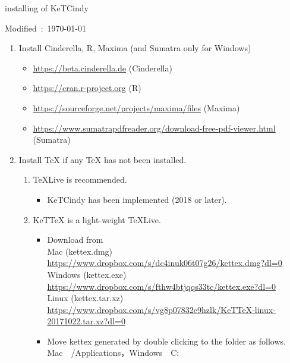 \documentclass{article}
\begin{document}
\begin{center}
installing of KeTCindy 
\end{center}

\hfill Modified\ :\ \today

\begin{enumerate}[\bf\large 1.]
\item Install Cinderella, R, Maxima (and Sumatra only for Windows)
 \begin{itemize}
 \item \url{https://beta.cinderella.de}  (Cinderella)
 \item \url{https://cran.r-project.org}   (R)
 \item \url{https://sourceforge.net/projects/maxima/files}  (Maxima)
 \item \url{https://www.sumatrapdfreader.org/download-free-pdf-viewer.html} (Sumatra)
 \end{itemize}
\item Install TeX if any TeX has not been installed.
 \begin{enumerate}[(1)]
 \item TeXLive is recommended.
    \begin{itemize}
    \item KeTCindy has been implemented (2018 or later).
    \end{itemize}
 \item KeTTeX is a light-weight TeXLive.
    \begin{itemize}
    \item Download from\\
    \hspace*{5mm}Mac (kettex.dmg)\\
    \hspace*{10mm}\url{https://www.dropbox.com/s/dc4inuk06t07g26/kettex.dmg?dl=0}\\
    \hspace*{5mm}Windows (kettex.exe)\\
    \hspace*{10mm}\url{https://www.dropbox.com/s/fthw4btjqqs33tc/kettex.exe?dl=0}\\
    \hspace*{5mm}Linux (kettex.tar.xz)\\
    \hspace*{10mm}\url{https://www.dropbox.com/s/vg8p07832e9hzlk/KeTTeX-linux-20171022.tar.xz?dl=0}
     \item Move kettex generated by double clicking to the folder as follows.\\
     \hspace*{10mm}Mac\ \ /Applications，Windows\ \ C:\
    \end{itemize}
 \end{enumerate}


\end{enumerate}
\end{document}
